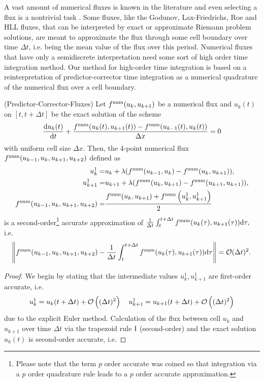 A vast amount of numerical fluxes is known in the literature \cite{Lax71, Roe1981, HLL1983, IsmailRoe2009} and even selecting a flux is a nontrivial task \cite{ranocha2018comparison}. Some fluxes, like the Godunov, Lax-Friedrichs, Roe and HLL fluxes, that can be interpreted by exact or approximate Riemann problem solutions, are meant to approximate the flux through some cell boundary over time $\Delta t$, i.e. being the mean value of the flux over this period.  
Numerical fluxes that have only a semidiscrete interpretation need some sort of high order time integration method. 
Our method for high-order time integration is based on a reinterpretation of predictor-corrector time integration \cite[p. 386]{Isaacson1966Analyis} as a numerical quadrature of the numerical flux over a cell boundary.

\begin{theorem}{(Predictor-Corrector-Fluxes)}\label{thm:rkflux}
	Let $f^{\mathrm{num}}(u_{k}, u_{k+1})$ be a numerical flux and  $u_k(t)$ on $[t, t + \Delta t]$ be the exact solution of the scheme 	\[
	\frac{\mathrm{d} {u_k(t)}}{\mathrm{d} {t}} + \frac{f^{\mathrm{num}}(u_{k}(t), u_{k+1}(t)) - f^{\mathrm{num}}(u_{k-1}(t), u_{k}(t))}{\Delta x} = 0
	\]
	with uniform cell size $\Delta x$.  
	Then, the 4-point numerical flux $f^{\mathrm{num}}(u_{k-1}, u_{k}, u_{k+1}, u_{k+2})$ defined as
	\[
	\begin{aligned}
	u^1_k =& u_k + \lambda (f^{\mathrm{num}}(u_{k-1}, u_k) - f^{\mathrm{num}}(u_{k}, u_{k+1})), \\
	u^1_{k+1} =& u_{k+1} + \lambda (f^{\mathrm{num}}(u_k, u_{k+1}) - f^{\mathrm{num}}(u_{k+1}, u_{k+1})), \\
	f^{\mathrm{num}}(u_{k-1}, u_{k}, u_{k+1}, u_{k+2}) =& \frac{f^{\mathrm{num}}(u_k, u_{k+1}) + f^{\mathrm{num}}\left (u^1_{k}, u^1_{k+1} \right)}{2}
	\end{aligned}
	\]
	is a second-order\footnote{Please note that the term $p$ order accurate was coined so that integration via a $p$ order quadrature rule leads to a $p$ order accurate approximation.} accurate approximation of
$
		\frac{1}{\Delta t}\int_{t}^{t + \Delta t} f^{\mathrm{num}}(u_{k}(\tau), u_{k+1}(\tau)) \mathrm{d} \tau,
$
	i.e.
	\[
		\norm{f^{\mathrm{num}}(u_{k-1}, u_{k}, u_{k+1}, u_{k+2}) - \frac{1}{\Delta t}\int_{t}^{t + \Delta t} f^{\mathrm{num}}(u_{k}(\tau), u_{k+1}(\tau)) \mathrm{d} \tau} = \mathcal O{(\Delta t)^2}.
	\]
	\begin{proof}
		We begin by stating that the intermediate values $u^1_{k}, u^1_{k+1}$ are first-order accurate, i.e. 
		\[
		u^1_{k} = u_k(t + \Delta t) + \mathcal O\left ((\Delta t)^2 \right) \quad u^1_{k+1} = u_{k+1}(t + \Delta t) + \mathcal O\left ((\Delta t)^2 \right)
		\]
		due to the explicit Euler method. Calculation of the flux between cell $u_k$ and $u_{k+1}$ over time $\Delta t$ via the trapezoid rule $\mathrm{I}$ (second-order) and the exact solution $u_k(t)$ is second-order accurate, i.e.

\end{proof}
\end{theorem}
